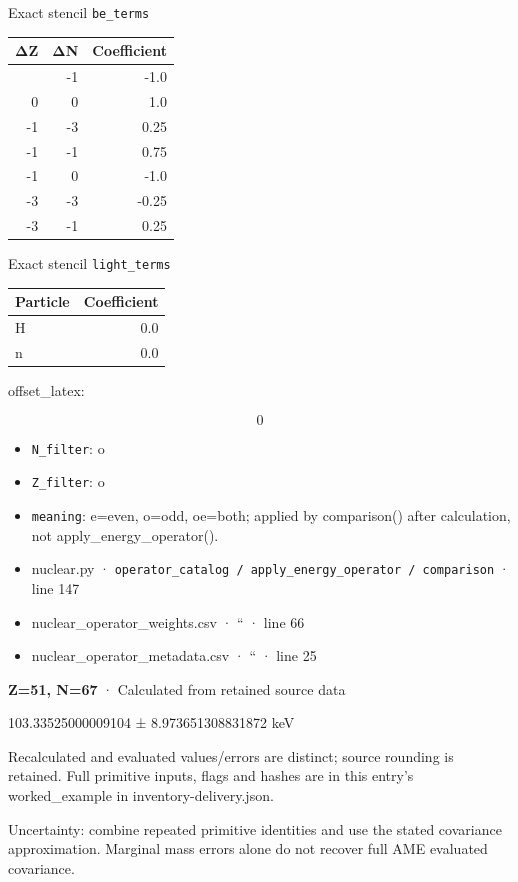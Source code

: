 \documentclass[
  11pt,
  letterpaper,
]{article}
\begin{document}
Exact stencil \texttt{be\_terms}

\begin{longtable}[]{@{}rrr@{}}
\toprule\noalign{}
ΔZ & ΔN & Coefficient \\
\midrule\noalign{}
\endhead
\bottomrule\noalign{}
\endlastfoot
0 & -1 & -1.0 \\
0 & 0 & 1.0 \\
-1 & -3 & 0.25 \\
-1 & -1 & 0.75 \\
-1 & 0 & -1.0 \\
-3 & -3 & -0.25 \\
-3 & -1 & 0.25 \\
\end{longtable}

Exact stencil \texttt{light\_terms}

\begin{longtable}[]{@{}lr@{}}
\toprule\noalign{}
Particle & Coefficient \\
\midrule\noalign{}
\endhead
\bottomrule\noalign{}
\endlastfoot
H & 0.0 \\
n & 0.0 \\
\end{longtable}

offset\_latex:

\[
0
\]

\begin{itemize}
\item
  \texttt{N\_filter}: o
\item
  \texttt{Z\_filter}: o
\item
  \texttt{meaning}: e=even, o=odd, oe=both; applied by comparison()
  after calculation, not apply\_energy\_operator().
\item
  nuclear.py ·
  \texttt{operator\_catalog\ /\ apply\_energy\_operator\ /\ comparison}
  · line 147
\item
  nuclear\_operator\_weights.csv · `` · line 66
\item
  nuclear\_operator\_metadata.csv · `` · line 25
\end{itemize}

\textbf{Z=51, N=67} · Calculated from retained source data

103.33525000009104 ± 8.973651308831872 keV

Recalculated and evaluated values/errors are distinct; source rounding
is retained. Full primitive inputs, flags and hashes are in this entry's
worked\_example in inventory-delivery.json.

Uncertainty: combine repeated primitive identities and use the stated
covariance approximation. Marginal mass errors alone do not recover full
AME evaluated covariance.
\end{document}
